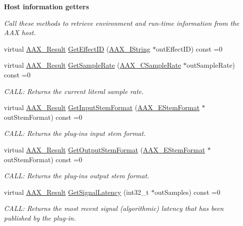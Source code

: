 \begin{Indent}{\bf Host information getters}\par
{\em Call these methods to retrieve environment and run-\/time information from the A\+A\+X host. }\begin{DoxyCompactItemize}
\item 
virtual \hyperlink{a00149_a4d8f69a697df7f70c3a8e9b8ee130d2f}{A\+A\+X\+\_\+\+Result} \hyperlink{a00090_ab36371e7f7c47f30882684481285f5eb}{Get\+Effect\+I\+D} (\hyperlink{a00113}{A\+A\+X\+\_\+\+I\+String} $\ast$out\+Effect\+I\+D) const =0
\item 
virtual \hyperlink{a00149_a4d8f69a697df7f70c3a8e9b8ee130d2f}{A\+A\+X\+\_\+\+Result} \hyperlink{a00090_afa1f9f64eeeab9570e5599f466fa699e}{Get\+Sample\+Rate} (\hyperlink{a00149_a3d9eea08f47e0b0a23432e15baa4e885}{A\+A\+X\+\_\+\+C\+Sample\+Rate} $\ast$out\+Sample\+Rate) const =0
\begin{DoxyCompactList}\small\item\em C\+A\+L\+L\+: Returns the current literal sample rate. \end{DoxyCompactList}\item 
virtual \hyperlink{a00149_a4d8f69a697df7f70c3a8e9b8ee130d2f}{A\+A\+X\+\_\+\+Result} \hyperlink{a00090_ab024489b47d3d5d2bcd52c9859aba663}{Get\+Input\+Stem\+Format} (\hyperlink{a00206_ad8af5ef008b2bd478add9a0acb0a1d85}{A\+A\+X\+\_\+\+E\+Stem\+Format} $\ast$out\+Stem\+Format) const =0
\begin{DoxyCompactList}\small\item\em C\+A\+L\+L\+: Returns the plug-\/in\textquotesingle{}s input stem format. \end{DoxyCompactList}\item 
virtual \hyperlink{a00149_a4d8f69a697df7f70c3a8e9b8ee130d2f}{A\+A\+X\+\_\+\+Result} \hyperlink{a00090_aabe72e915df571776d4aa1c36ef8d6f2}{Get\+Output\+Stem\+Format} (\hyperlink{a00206_ad8af5ef008b2bd478add9a0acb0a1d85}{A\+A\+X\+\_\+\+E\+Stem\+Format} $\ast$out\+Stem\+Format) const =0
\begin{DoxyCompactList}\small\item\em C\+A\+L\+L\+: Returns the plug-\/in\textquotesingle{}s output stem format. \end{DoxyCompactList}\item 
virtual \hyperlink{a00149_a4d8f69a697df7f70c3a8e9b8ee130d2f}{A\+A\+X\+\_\+\+Result} \hyperlink{a00090_ad50aa6fd54e39623a58debd63d9551e1}{Get\+Signal\+Latency} (int32\+\_\+t $\ast$out\+Samples) const =0
\begin{DoxyCompactList}\small\item\em C\+A\+L\+L\+: Returns the most recent signal (algorithmic) latency that has been published by the plug-\/in. \end{DoxyCompactList}\item 

\end{DoxyCompactItemize}
\end{Indent}
